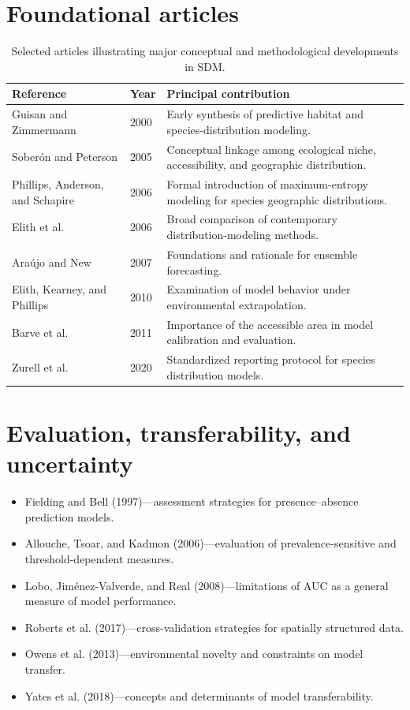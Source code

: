 \section{Foundational articles}

\begin{table}[H]
\centering
\caption{Selected articles illustrating major conceptual and methodological developments in SDM.}
\label{tab:artigos_classicos_sdm}
\small
\setlength{\tabcolsep}{3pt}
\begin{tabular}{p{}p{}p{}}
\toprule
\textbf{Reference} & \textbf{Year} & \textbf{Principal contribution} \\
\midrule
Guisan and Zimmermann & 2000 & Early synthesis of predictive habitat and species-distribution modeling. \\
Soberón and Peterson & 2005 & Conceptual linkage among ecological niche, accessibility, and geographic distribution. \\
Phillips, Anderson, and Schapire & 2006 & Formal introduction of maximum-entropy modeling for species geographic distributions. \\
Elith et al. & 2006 & Broad comparison of contemporary distribution-modeling methods. \\
Araújo and New & 2007 & Foundations and rationale for ensemble forecasting. \\
Elith, Kearney, and Phillips & 2010 & Examination of model behavior under environmental extrapolation. \\
Barve et al. & 2011 & Importance of the accessible area in model calibration and evaluation. \\
Zurell et al. & 2020 & Standardized reporting protocol for species distribution models. \\
\bottomrule
\end{tabular}
\end{table}

\section{Evaluation, transferability, and uncertainty}

\begin{itemize}
\item Fielding and Bell (1997)---assessment strategies for presence--absence prediction models.
\item Allouche, Tsoar, and Kadmon (2006)---evaluation of prevalence-sensitive and threshold-dependent measures.
\item Lobo, Jiménez-Valverde, and Real (2008)---limitations of AUC as a general measure of model performance.
\item Roberts et al. (2017)---cross-validation strategies for spatially structured data.
\item Owens et al. (2013)---environmental novelty and constraints on model transfer.
\item Yates et al. (2018)---concepts and determinants of model transferability.
\end{itemize}

